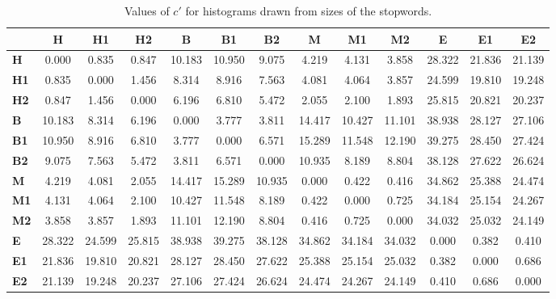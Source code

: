 \begin{table*}[h!]
\begin{center}
\begin{tabular}{| l || c | c | c || c | c | c || c | c | c || c | c | c |}\hline
 & {\bf H} & {\bf H1} & {\bf H2} & {\bf B} & {\bf B1} & {\bf B2} & {\bf M} & {\bf M1} & {\bf M2} & {\bf E} & {\bf E1} & {\bf E2} \\\hline\hline
{\bf H} & 0.000 & 0.835 & 0.847 & 10.183 & 10.950 & 9.075 & 4.219 & 4.131 & 3.858 & 28.322 & 21.836 & 21.139 \\\hline
{\bf H1} & 0.835 & 0.000 & 1.456 & 8.314 & 8.916 & 7.563 & 4.081 & 4.064 & 3.857 & 24.599 & 19.810 & 19.248 \\\hline
{\bf H2} & 0.847 & 1.456 & 0.000 & 6.196 & 6.810 & 5.472 & 2.055 & 2.100 & 1.893 & 25.815 & 20.821 & 20.237 \\\hline\hline
{\bf B} & 10.183 & 8.314 & 6.196 & 0.000 & 3.777 & 3.811 & 14.417 & 10.427 & 11.101 & 38.938 & 28.127 & 27.106 \\\hline
{\bf B1} & 10.950 & 8.916 & 6.810 & 3.777 & 0.000 & 6.571 & 15.289 & 11.548 & 12.190 & 39.275 & 28.450 & 27.424 \\\hline
{\bf B2} & 9.075 & 7.563 & 5.472 & 3.811 & 6.571 & 0.000 & 10.935 & 8.189 & 8.804 & 38.128 & 27.622 & 26.624 \\\hline\hline
{\bf M} & 4.219 & 4.081 & 2.055 & 14.417 & 15.289 & 10.935 & 0.000 & 0.422 & 0.416 & 34.862 & 25.388 & 24.474 \\\hline
{\bf M1} & 4.131 & 4.064 & 2.100 & 10.427 & 11.548 & 8.189 & 0.422 & 0.000 & 0.725 & 34.184 & 25.154 & 24.267 \\\hline
{\bf M2} & 3.858 & 3.857 & 1.893 & 11.101 & 12.190 & 8.804 & 0.416 & 0.725 & 0.000 & 34.032 & 25.032 & 24.149 \\\hline\hline
{\bf E} & 28.322 & 24.599 & 25.815 & 38.938 & 39.275 & 38.128 & 34.862 & 34.184 & 34.032 & 0.000 & 0.382 & 0.410 \\\hline
{\bf E1} & 21.836 & 19.810 & 20.821 & 28.127 & 28.450 & 27.622 & 25.388 & 25.154 & 25.032 & 0.382 & 0.000 & 0.686 \\\hline
{\bf E2} & 21.139 & 19.248 & 20.237 & 27.106 & 27.424 & 26.624 & 24.474 & 24.267 & 24.149 & 0.410 & 0.686 & 0.000 \\\hline
\end{tabular}
\caption{Values of $c'$ for histograms drawn from sizes of the stopwords.}
\end{center}
\end{table*}